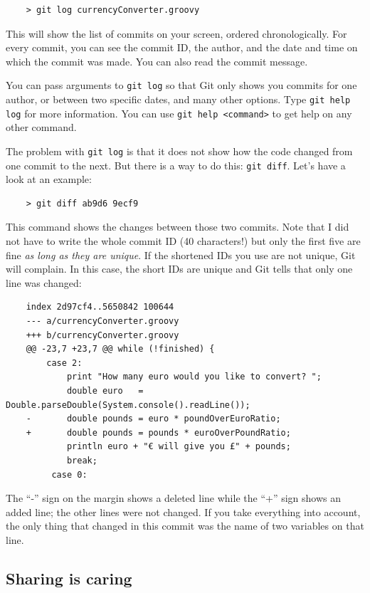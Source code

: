 \begin{verbatim}
    > git log currencyConverter.groovy
\end{verbatim}

This will show the list of commits on your screen, ordered
chronologically. For every commit, you can see the commit ID, the
author, and the date and time on which the commit was made. You can
also read the commit message. 

You can pass arguments to \verb+git log+ so that Git only shows you
commits for one author, or between two specific dates, and many
other options. Type \verb+git help log+ for more information. You can
use \verb+git help <command>+ to get help on any other command. 

The problem with \verb+git log+ is that it does not show how the code
changed from one commit to the next. But there is a way to do this:
\verb+git diff+. Let's have a look at an example: 

\begin{verbatim}
    > git diff ab9d6 9ecf9
\end{verbatim}

This command shows the changes between those two commits. Note that I
did not have to write the whole commit ID (40 characters!) but only
the first five are fine \emph{as long as they are unique}. If the
shortened IDs you use are not unique, Git will complain. In this case,
the short IDs are unique and Git tells that only one line was changed: 

\begin{verbatim}
    index 2d97cf4..5650842 100644
    --- a/currencyConverter.groovy
    +++ b/currencyConverter.groovy
    @@ -23,7 +23,7 @@ while (!finished) {
        case 2: 
            print "How many euro would you like to convert? ";
            double euro   = Double.parseDouble(System.console().readLine());
    -       double pounds = euro * poundOverEuroRatio;
    +       double pounds = pounds * euroOverPoundRatio;
            println euro + "€ will give you £" + pounds;
            break;
         case 0:  
\end{verbatim}

The ``-'' sign on the margin shows a deleted line while the ``+'' sign
shows an added line; the other lines were not changed. 
If you take everything into account, the only thing that changed
in this commit was the name of two variables on that line. 

\subsection{Sharing is caring}
\label{sec:sharing-caring}

